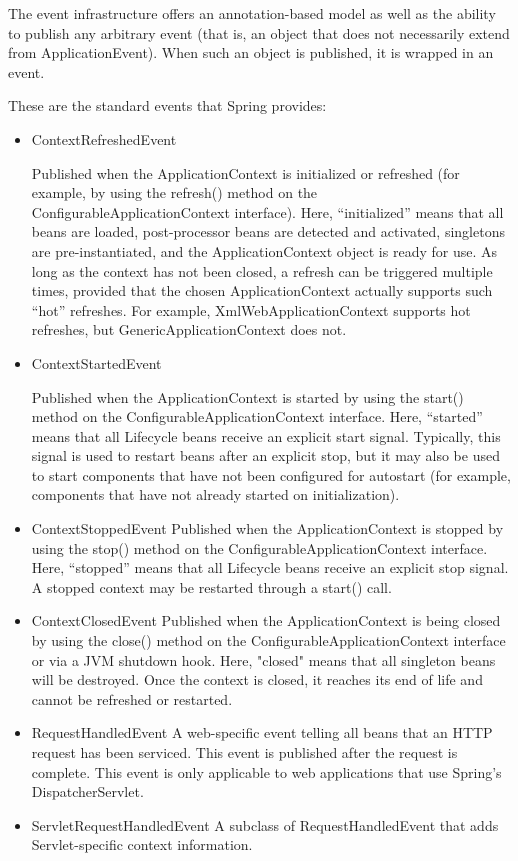 \documentclass{scrartcl}
\begin{document}
The event infrastructure offers an annotation-based model as well as the ability to publish any arbitrary event (that is, an object that does not necessarily extend from ApplicationEvent). When such an object is published, it is wrapped in an event.

These are the standard events that Spring provides:

\begin{itemize}
    \item ContextRefreshedEvent

     Published when the ApplicationContext is initialized or refreshed (for example, by using the refresh() method on the ConfigurableApplicationContext interface). Here, “initialized” means that all beans are loaded, post-processor beans are detected and activated, singletons are pre-instantiated, and the ApplicationContext object is ready for use. As long as the context has not been closed, a refresh can be triggered multiple times, provided that the chosen ApplicationContext actually supports such “hot” refreshes. For example, XmlWebApplicationContext supports hot refreshes, but GenericApplicationContext does not.
    \item ContextStartedEvent

     Published when the ApplicationContext is started by using the start() method on the ConfigurableApplicationContext interface. Here, “started” means that all Lifecycle beans receive an explicit start signal. Typically, this signal is used to restart beans after an explicit stop, but it may also be used to start components that have not been configured for autostart (for example, components that have not already started on initialization).
     \item ContextStoppedEvent Published when the ApplicationContext is stopped by using the stop() method on the ConfigurableApplicationContext interface. Here, “stopped” means that all Lifecycle beans receive an explicit stop signal. A stopped context may be restarted through a start() call.
    \item ContextClosedEvent
     Published when the ApplicationContext is being closed by using the close() method on the ConfigurableApplicationContext interface or via a JVM shutdown hook. Here, "closed" means that all singleton beans will be destroyed. Once the context is closed, it reaches its end of life and cannot be refreshed or restarted.
    \item RequestHandledEvent
     A web-specific event telling all beans that an HTTP request has been serviced. This event is published after the request is complete. This event is only applicable to web applications that use Spring’s DispatcherServlet.
    \item ServletRequestHandledEvent
     A subclass of RequestHandledEvent that adds Servlet-specific context information.
\end{itemize}
\end{document}
